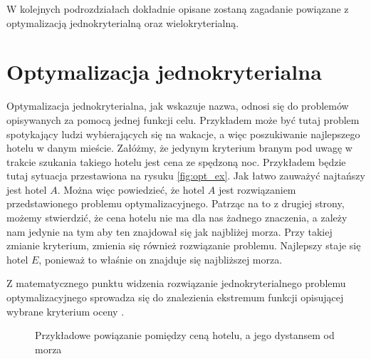 \documentclass[twoside]{iisthesis}
\begin{document}
W kolejnych podrozdziałach dokładnie opisane zostaną zagadanie powiązane z optymalizacją jednokryterialną oraz wielokryterialną.
\section{Optymalizacja jednokryterialna}
Optymalizacja jednokryterialna, jak wskazuje nazwa, odnosi się do problemów opisywanych za pomocą jednej funkcji celu. Przykładem może być tutaj problem spotykający ludzi wybierających się na wakacje, a więc poszukiwanie najlepszego hotelu w danym mieście. Załóżmy, że jedynym kryterium branym pod uwagę w trakcie szukania takiego hotelu jest cena ze spędzoną noc. Przykładem będzie tutaj sytuacja przestawiona na rysuku \eqref{fig:opt_ex}. Jak łatwo zauważyć najtańszy jest hotel $A$. Można więc powiedzieć, że hotel $A$ jest rozwiązaniem przedstawionego problemu optymalizacyjnego. Patrząc na to z drugiej strony, możemy stwierdzić, że cena hotelu nie ma dla nas żadnego znaczenia, a zależy nam jedynie na tym aby ten znajdował się jak najbliżej morza. Przy takiej zmianie kryterium, zmienia się również rozwiązanie problemu. Najlepszy staje się hotel $E$, ponieważ to właśnie on znajduje się najbliższej morza.

Z matematycznego punktu widzenia rozwiązanie jednokryterialnego problemu optymalizacyjnego sprowadza się do znalezienia ekstremum  funkcji opisującej wybrane kryterium oceny \cite{wiki_pl_optimization}.
\begin{figure}[!htb]
	\centering
	\caption{Przykładowe powiązanie pomiędzy ceną hotelu, a jego dystansem od morza}
	\label{fig:opt_ex}
\end{figure}
\end{document}
